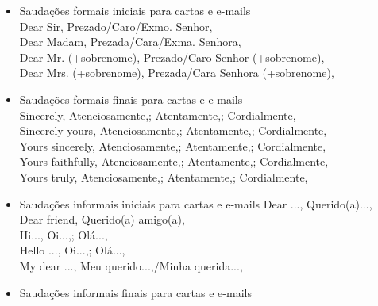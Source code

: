 \documentclass[12pt,a4paper]{article} %
\begin{document}
\begin{itemize}
Good night! 	Boa noite!\\
See you later! 	Até logo!\\
See ya! 	Até logo!\\
Until next time! 	Até a próxima!\\
See you tomorrow! 	Até amanhã!\\
Goodbye! 	Tchau!\\
Bye! 	Tchau!\\
Bye-bye 	Tchau!\\
Pleased to meet you! 	Prazer em conhecê-lo!\\
Nice to meet you! 	Prazer em conhecê-lo!\\
Take care! 	Se cuida!\\
Have a nice weekend! 	Bom fim de semana!\\
Have a nice day! 	Tenha um bom dia!\\
So long! 	Até!
		\item Saudações formais iniciais para cartas e e-mails\\
Dear Sir, 	Prezado/Caro/Exmo. Senhor,\\
Dear Madam, 	Prezada/Cara/Exma. Senhora,\\
Dear Mr. (+sobrenome), 	Prezado/Caro Senhor (+sobrenome),\\
Dear Mrs. (+sobrenome), 	Prezada/Cara Senhora (+sobrenome),\\
		\item Saudações formais finais para cartas e e-mails\\
Sincerely, 	Atenciosamente,; Atentamente,; Cordialmente,\\
Sincerely yours, 	Atenciosamente,; Atentamente,; Cordialmente,\\
Yours sincerely, 	Atenciosamente,; Atentamente,; Cordialmente,\\
Yours faithfully, 	Atenciosamente,; Atentamente,; Cordialmente,\\
Yours truly, 	Atenciosamente,; Atentamente,; Cordialmente,
		\item Saudações informais iniciais para cartas e e-mails
Dear ..., 	Querido(a)...,\\
Dear friend, 	Querido(a) amigo(a),\\
Hi..., 	Oi...,; Olá...,\\
Hello ..., 	Oi...,; Olá...,\\
My dear ..., 	Meu querido...,/Minha querida...,
		\item Saudações informais finais para cartas e e-mails\\

\end{itemize}
\end{document}
